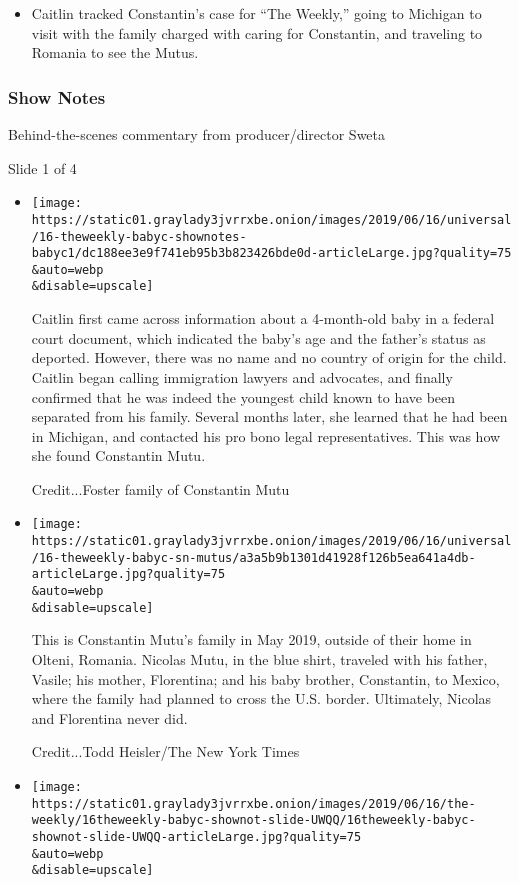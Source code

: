 \begin{itemize}
\tightlist
\item
  Caitlin tracked Constantin's case for ``The Weekly,'' going to
  Michigan to visit with the family charged with caring for Constantin,
  and traveling to Romania to see the Mutus.
\end{itemize}

\hypertarget{show-notes}{%
\subsubsection{Show Notes}\label{show-notes}}

Behind-the-scenes commentary from producer/director Sweta

Slide 1 of 4

\begin{itemize}
\item
  \texttt{[image: https://static01.graylady3jvrrxbe.onion/images/2019/06/16/universal/16-theweekly-babyc-shownotes-babyc1/dc188ee3e9f741eb95b3b823426bde0d-articleLarge.jpg?quality=75\\\&auto=webp\\\&disable=upscale]}

  Caitlin first came across information about a 4-month-old baby in a
  federal court document, which indicated the baby's age and the
  father's status as deported. However, there was no name and no country
  of origin for the child. Caitlin began calling immigration lawyers and
  advocates, and finally confirmed that he was indeed the youngest child
  known to have been separated from his family. Several months later,
  she learned that he had been in Michigan, and contacted his pro bono
  legal representatives. This was how she found Constantin Mutu.~

  Credit...Foster family of Constantin Mutu
\item
  \texttt{[image: https://static01.graylady3jvrrxbe.onion/images/2019/06/16/universal/16-theweekly-babyc-sn-mutus/a3a5b9b1301d41928f126b5ea641a4db-articleLarge.jpg?quality=75\\\&auto=webp\\\&disable=upscale]}

  This is Constantin Mutu's family in May 2019, outside of their home in
  Olteni, Romania. Nicolas Mutu, in the blue shirt, traveled with his
  father, Vasile; his mother, Florentina; and his baby brother,
  Constantin, to Mexico, where the family had planned to cross the U.S.
  border. Ultimately, Nicolas and Florentina never did.

  Credit...Todd Heisler/The New York Times
\item
  \texttt{[image: https://static01.graylady3jvrrxbe.onion/images/2019/06/16/the-weekly/16theweekly-babyc-shownot-slide-UWQQ/16theweekly-babyc-shownot-slide-UWQQ-articleLarge.jpg?quality=75\\\&auto=webp\\\&disable=upscale]}


\end{itemize}
